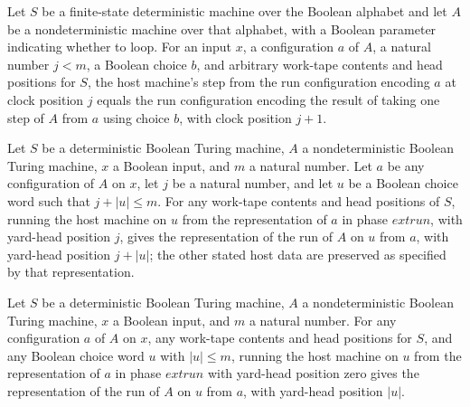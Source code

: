 \begin{theorem}
\label{Turing.ClockHost.run_step}
\leanok
{}
Let $S$ be a finite-state deterministic machine over the Boolean alphabet and let $A$ be
a nondeterministic machine over that alphabet, with a Boolean parameter indicating
whether to loop. For an input $x$, a configuration $a$ of $A$, a natural number $j<m$, a
Boolean choice $b$, and arbitrary work-tape contents and head positions for $S$, the
host machine’s step from the run configuration encoding $a$ at clock position $j$ equals
the run configuration encoding the result of taking one step of $A$ from $a$ using
choice $b$, with clock position $j+1$.
\end{theorem}

\begin{theorem}
\label{Turing.ClockHost.run_run}
\leanok
{}
Let $S$ be a deterministic Boolean Turing machine, $A$ a nondeterministic Boolean Turing
machine, $x$ a Boolean input, and $m$ a natural number. Let $a$ be any configuration of
$A$ on $x$, let $j$ be a natural number, and let $u$ be a Boolean choice word such that
$j+|u|\le m$. For any work-tape contents and head positions of $S$, running the host
machine on $u$ from the representation of $a$ in phase $	ext{run}$, with yard-head
position $j$, gives the representation of the run of $A$ on $u$ from $a$, with yard-head
position $j+|u|$; the other stated host data are preserved as specified by that
representation.
\end{theorem}

\begin{theorem}
\label{Turing.ClockHost.run_run_zero}
\leanok
{}
Let $S$ be a deterministic Boolean Turing machine, $A$ a nondeterministic Boolean Turing
machine, $x$ a Boolean input, and $m$ a natural number. For any configuration $a$ of $A$
on $x$, any work-tape contents and head positions for $S$, and any Boolean choice word
$u$ with $|u|\le m$, running the host machine on $u$ from the representation of $a$ in
phase $	ext{run}$ with yard-head position zero gives the representation of the run of
$A$ on $u$ from $a$, with yard-head position $|u|$.
\end{theorem}

